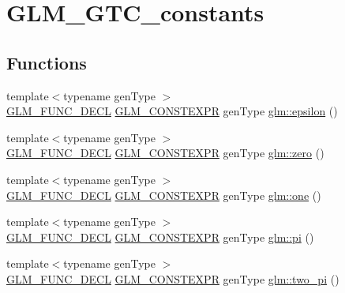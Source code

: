 \hypertarget{group__gtc__constants}{}\section{G\+L\+M\+\_\+\+G\+T\+C\+\_\+constants}
\label{group__gtc__constants}
\subsection*{Functions}
\begin{DoxyCompactItemize}
\item 
{\footnotesize template$<$typename gen\+Type $>$ }\\\hyperlink{setup_8hpp_ab2d052de21a70539923e9bcbf6e83a51}{G\+L\+M\+\_\+\+F\+U\+N\+C\+\_\+\+D\+E\+CL} \hyperlink{setup_8hpp_a08b807947b47031d3a511f03f89645ad}{G\+L\+M\+\_\+\+C\+O\+N\+S\+T\+E\+X\+PR} gen\+Type \hyperlink{group__gtc__constants_ga2a1e57fc5592b69cfae84174cbfc9429}{glm\+::epsilon} ()
\item 
{\footnotesize template$<$typename gen\+Type $>$ }\\\hyperlink{setup_8hpp_ab2d052de21a70539923e9bcbf6e83a51}{G\+L\+M\+\_\+\+F\+U\+N\+C\+\_\+\+D\+E\+CL} \hyperlink{setup_8hpp_a08b807947b47031d3a511f03f89645ad}{G\+L\+M\+\_\+\+C\+O\+N\+S\+T\+E\+X\+PR} gen\+Type \hyperlink{group__gtc__constants_ga788f5a421fc0f40a1296ebc094cbaa8a}{glm\+::zero} ()
\item 
{\footnotesize template$<$typename gen\+Type $>$ }\\\hyperlink{setup_8hpp_ab2d052de21a70539923e9bcbf6e83a51}{G\+L\+M\+\_\+\+F\+U\+N\+C\+\_\+\+D\+E\+CL} \hyperlink{setup_8hpp_a08b807947b47031d3a511f03f89645ad}{G\+L\+M\+\_\+\+C\+O\+N\+S\+T\+E\+X\+PR} gen\+Type \hyperlink{group__gtc__constants_ga39c2fb227631ca25894326529bdd1ee5}{glm\+::one} ()
\item 
{\footnotesize template$<$typename gen\+Type $>$ }\\\hyperlink{setup_8hpp_ab2d052de21a70539923e9bcbf6e83a51}{G\+L\+M\+\_\+\+F\+U\+N\+C\+\_\+\+D\+E\+CL} \hyperlink{setup_8hpp_a08b807947b47031d3a511f03f89645ad}{G\+L\+M\+\_\+\+C\+O\+N\+S\+T\+E\+X\+PR} gen\+Type \hyperlink{group__gtc__constants_ga94bafeb2a0f23ab6450fed1f98ee4e45}{glm\+::pi} ()
\item 
{\footnotesize template$<$typename gen\+Type $>$ }\\\hyperlink{setup_8hpp_ab2d052de21a70539923e9bcbf6e83a51}{G\+L\+M\+\_\+\+F\+U\+N\+C\+\_\+\+D\+E\+CL} \hyperlink{setup_8hpp_a08b807947b47031d3a511f03f89645ad}{G\+L\+M\+\_\+\+C\+O\+N\+S\+T\+E\+X\+PR} gen\+Type \hyperlink{group__gtc__constants_gaa5276a4617566abcfe49286f40e3a256}{glm\+::two\+\_\+pi} ()

\end{DoxyCompactItemize}

